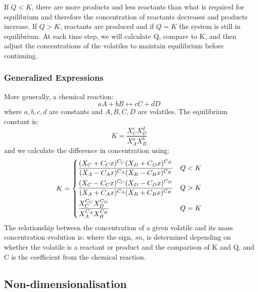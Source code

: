 If $Q < K$, there are more products and less reactants than what is required for equilibrium and therefore the concentration of reactants decreases and products increase. If $Q > K$, reactants are produced and if $Q = K$ the system is still in equilibrium. At each time step, we will calculate Q, compare to K, and then adjust the concentrations of the volatiles to maintain equilibrium before continuing. 

\subsubsection{Generalized Expressions}
More generally, a chemical reaction: 
\begin{equation}
    aA + bB \leftrightarrow cC + dD
\end{equation}
where $a,b,c,d$ are constants and $A,B,C,D$ are volatiles.  The equilibrium constant is: 
\begin{equation}
    K = \frac{X_C^c X_D^d}{X_A^a X_B^b}
\end{equation}
and we calculate the difference in concentration using: 
\begin{equation}
K = 
     \begin{dcases}
        \frac{(X_C + C_Cx)^{C_C} (X_D + C_Dx)^{C_D}}{(X_A-C_Ax)^{C_A} (X_B-C_Bx)^{C_B}} & Q < K \\
        \frac{(X_C - C_Cx)^{C_C} (X_D - C_Dx)^{C_D}}{(X_A+C_Ax)^{C_A} (X_B+C_Bx)^{C_B}} & Q > K\\
        \frac{X_C^{C_C} X_D^{C_D}}{X_A^{C_A} X_B^{C_B}} & Q = K \\
    \end{dcases}
\end{equation}
The relationship between the concentration of a given volatile and its mass concentration evolution is: 
where the sign, $sn$, is determined depending on whether the volatile is a reactant or product and the comparison of K and Q, and C is the coefficient from the chemical reaction. 

\subsection{Non-dimensionalisation}
